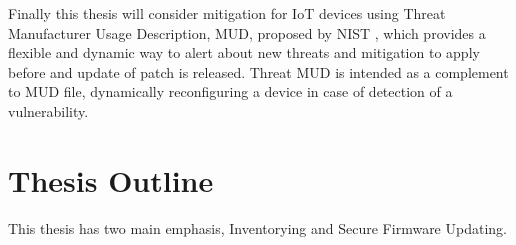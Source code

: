 Finally this thesis will consider mitigation for IoT devices using Threat Manufacturer Usage Description, MUD,
proposed by NIST \cite{dodson2021securing}, which provides a flexible and dynamic way to alert about new threats and
mitigation to apply before and update of patch is released. Threat MUD is intended as a complement to MUD file,
dynamically reconfiguring a device in case of detection of a vulnerability.

\section{Thesis Outline}

This thesis has two main emphasis, Inventorying and Secure Firmware Updating.
